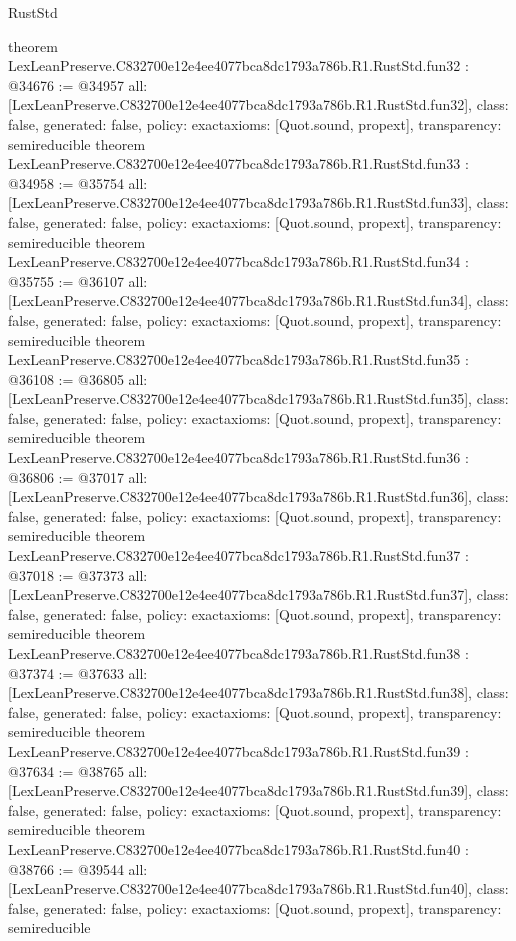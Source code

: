 \begin{lexlean}{RustStd}
\begin{coremodule}
{}
theorem LexLeanPreserve.C832700e12e4ee4077bca8dc1793a786b.R1.RustStd.fun32 : @34676 := @34957 {
  all: [LexLeanPreserve.C832700e12e4ee4077bca8dc1793a786b.R1.RustStd.fun32],
  class: false,
  generated: false,
  policy: exact{axioms: [Quot.sound, propext]},
  transparency: semireducible
}
theorem LexLeanPreserve.C832700e12e4ee4077bca8dc1793a786b.R1.RustStd.fun33 : @34958 := @35754 {
  all: [LexLeanPreserve.C832700e12e4ee4077bca8dc1793a786b.R1.RustStd.fun33],
  class: false,
  generated: false,
  policy: exact{axioms: [Quot.sound, propext]},
  transparency: semireducible
}
theorem LexLeanPreserve.C832700e12e4ee4077bca8dc1793a786b.R1.RustStd.fun34 : @35755 := @36107 {
  all: [LexLeanPreserve.C832700e12e4ee4077bca8dc1793a786b.R1.RustStd.fun34],
  class: false,
  generated: false,
  policy: exact{axioms: [Quot.sound, propext]},
  transparency: semireducible
}
theorem LexLeanPreserve.C832700e12e4ee4077bca8dc1793a786b.R1.RustStd.fun35 : @36108 := @36805 {
  all: [LexLeanPreserve.C832700e12e4ee4077bca8dc1793a786b.R1.RustStd.fun35],
  class: false,
  generated: false,
  policy: exact{axioms: [Quot.sound, propext]},
  transparency: semireducible
}
theorem LexLeanPreserve.C832700e12e4ee4077bca8dc1793a786b.R1.RustStd.fun36 : @36806 := @37017 {
  all: [LexLeanPreserve.C832700e12e4ee4077bca8dc1793a786b.R1.RustStd.fun36],
  class: false,
  generated: false,
  policy: exact{axioms: [Quot.sound, propext]},
  transparency: semireducible
}
theorem LexLeanPreserve.C832700e12e4ee4077bca8dc1793a786b.R1.RustStd.fun37 : @37018 := @37373 {
  all: [LexLeanPreserve.C832700e12e4ee4077bca8dc1793a786b.R1.RustStd.fun37],
  class: false,
  generated: false,
  policy: exact{axioms: [Quot.sound, propext]},
  transparency: semireducible
}
theorem LexLeanPreserve.C832700e12e4ee4077bca8dc1793a786b.R1.RustStd.fun38 : @37374 := @37633 {
  all: [LexLeanPreserve.C832700e12e4ee4077bca8dc1793a786b.R1.RustStd.fun38],
  class: false,
  generated: false,
  policy: exact{axioms: [Quot.sound, propext]},
  transparency: semireducible
}
theorem LexLeanPreserve.C832700e12e4ee4077bca8dc1793a786b.R1.RustStd.fun39 : @37634 := @38765 {
  all: [LexLeanPreserve.C832700e12e4ee4077bca8dc1793a786b.R1.RustStd.fun39],
  class: false,
  generated: false,
  policy: exact{axioms: [Quot.sound, propext]},
  transparency: semireducible
}
theorem LexLeanPreserve.C832700e12e4ee4077bca8dc1793a786b.R1.RustStd.fun40 : @38766 := @39544 {
  all: [LexLeanPreserve.C832700e12e4ee4077bca8dc1793a786b.R1.RustStd.fun40],
  class: false,
  generated: false,
  policy: exact{axioms: [Quot.sound, propext]},
  transparency: semireducible
}
\end{coremodule}
\end{lexlean}

